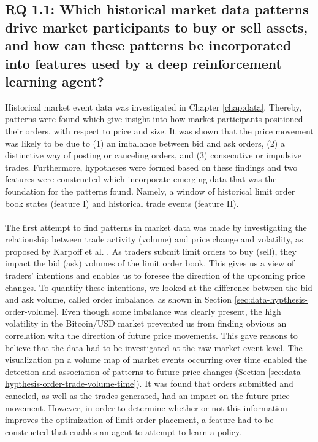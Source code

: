\subsection{RQ 1.1: Which historical market data patterns drive market participants to buy or sell assets, and how can these patterns be incorporated into features used by a deep reinforcement learning agent?}

    Historical market event data was investigated in Chapter \ref{chap:data}. 
    Thereby, patterns were found which give insight into how market participants positioned their orders, with respect to price and size. 
    It was shown that the price movement was likely to be due to (1) an imbalance between bid and ask orders, (2) a distinctive way of posting or canceling orders, and (3) consecutive or impulsive trades.
    Furthermore, hypotheses were formed based on these findings and two features were constructed which incorporate emerging data that was the foundation for the patterns found.
    Namely, a window of historical limit order book states (feature I) and historical trade events (feature II).
    \\
    \\
The first attempt to find patterns in market data was made by investigating the relationship between trade activity (volume) and price change and volatility, as proposed by Karpoff et al. \cite{karpoff1987relation}.  
As traders submit limit orders to buy (sell), they impact the bid (ask) volumes of the  limit order book. This gives us a view of traders’ intentions and enables us to foresee the direction of the upcoming price changes.
To quantify these intentions, we looked at the difference between the bid and ask volume, called order imbalance, as shown in Section \ref{sec:data-hypthesis-order-volume}.
Even though some imbalance was clearly present, the high volatility in the Bitcoin/USD market prevented us from finding obvious an correlation with the direction of future price movements.
This gave reasons to believe that the data had to be investigated at the raw market event level\cite{kane2011analyzing}.
The visualization pn a volume map of market events occurring over time enabled the detection and association of patterns to future price changes (Section \ref{sec:data-hypthesis-order-trade-volume-time}).
It was found that orders submitted and canceled, as well as the trades generated, had an impact on the future price movement.
However, in order to determine whether or not this information improves the optimization of limit order placement, a feature had to be constructed that enables an agent to attempt to learn a policy.

